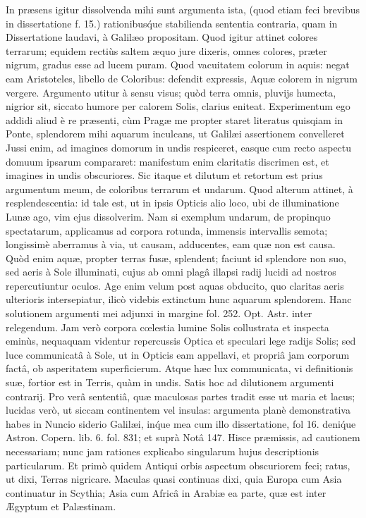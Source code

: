\documentclass[a4paper, 11pt, oneside, polutonikogreek, german]{article}
\begin{document}
In præsens igitur dissolvenda mihi sunt argumenta ista, (quod etiam feci brevibus in dissertatione f. 15.) rationibus\'que stabilienda sententia contraria, quam in Dissertatione laudavi, à Galilæo propositam. Quod igitur attinet colores terrarum; equidem rectiùs saltem æquo jure dixeris, omnes colores, præter nigrum, gradus esse ad lucem puram. Quod vacuitatem colorum in aquis: negat eam Aristoteles, libello de Coloribus: defendit expressis, Aquæ colorem in nigrum vergere. Argumento utitur à sensu visus; quòd terra omnis, pluvijs humecta, nigrior sit, siccato humore per calorem Solis, clarius eniteat. Experimentum ego addidi aliud è re præsenti, cùm Pragæ me propter staret literatus quisqiam in Ponte, splendorem mihi aquarum inculcans, ut Galilæi assertionem convelleret Jussi enim, ad imagines domorum in undis respiceret, easque cum recto aspectu domuum ipsarum compararet: manifestum enim claritatis discrimen est, et imagines in undis obscuriores. Sic itaque et dilutum et retortum est prius argumentum meum, de coloribus terrarum et undarum. Quod alterum attinet, à resplendescentia: id tale est, ut in ipsis Opticis alio loco, ubi de illuminatione Lunæ ago, vim ejus dissolverim. Nam si exemplum undarum, de propinquo spectatarum, applicamus ad corpora rotunda, immensis intervallis semota; longissimè aberramus à via, ut causam, adducentes, eam quæ non est causa. Quòd enim aquæ, propter terras fusæ, splendent; faciunt id splendore non suo, sed aeris à Sole illuminati, cujus ab omni plagâ illapsi radij lucidi ad nostros repercutiuntur oculos. Age enim velum post aquas obducito, quo claritas aeris ulterioris intersepiatur, ilicò videbis extinctum hunc aquarum splendorem. Hanc solutionem argumenti mei adjunxi in margine fol. 252. Opt. Astr. inter relegendum. Jam verò corpora cœlestia lumine Solis collustrata et inspecta eminùs, nequaquam videntur repercussis Optica et speculari lege radijs Solis; sed luce communicatâ à Sole, ut in Opticis eam appellavi, et propriâ jam corporum factâ, ob asperitatem superficierum. Atque hæc lux communicata, vi definitionis suæ, fortior est in Terris, quàm in undis. Satis hoc ad dilutionem argumenti contrarij. Pro verâ sententiâ, quæ maculosas partes tradit esse ut maria et lacus; lucidas verò, ut siccam continentem vel insulas: argumenta planè demonstrativa habes in Nuncio siderio Galilæi, in\'que mea cum illo dissertatione, fol 16. deni\'que Astron. Copern. lib. 6. fol. 831; et suprà Notâ 147.\hspace*{5mm}
Hisce præmissis, ad cautionem necessariam; nunc jam rationes explicabo singularum hujus descriptionis particularum. Et primò quidem Antiqui orbis aspectum obscuriorem feci; ratus, ut dixi, Terras nigricare. Maculas quasi continuas dixi, quia Europa cum Asia continuatur in Scythia; Asia cum Africâ in Arabiæ ea parte, quæ est inter Ægyptum et Palæstinam.
\end{document}
